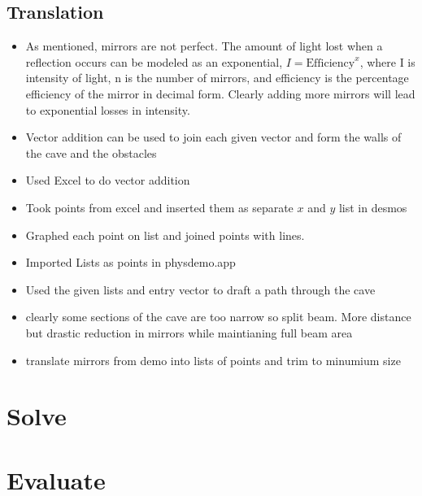 \documentclass[11pt, letterpaper]{article}
\begin{document}
\subsection{Translation}
\par 

\begin{itemize}
	
\item	As mentioned, mirrors are not perfect. The amount of light lost when a reflection occurs can be modeled as an exponential, $I=\textrm{Efficiency}^x$, where I is intensity of light, n is the number of mirrors, and efficiency is the percentage efficiency of the mirror in decimal form. Clearly  adding more mirrors will lead to exponential losses in intensity.

\item Vector addition can be used to join each given vector and form the walls of the cave and the obstacles

\item Used Excel to do vector addition

\item Took points from excel and inserted them as separate $x$ and $y$ list in desmos

\item Graphed each point on list and joined points with lines.

\item Imported Lists as points in physdemo.app

\item Used the given lists and entry vector to draft a path through the cave

\item  clearly some sections of the cave are too narrow so split beam. More distance but drastic reduction in mirrors while maintianing full beam area

\item translate mirrors from demo into lists of points and trim to minumium size
\end{itemize}


\par 


\section{Solve}

\par 


\section{Evaluate}
\end{document}
